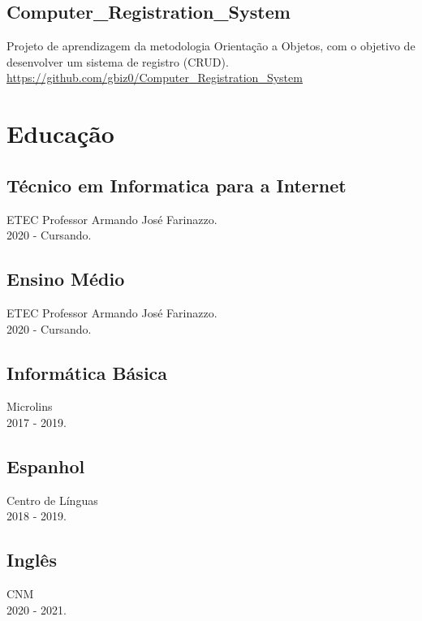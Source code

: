 \documentclass[16pt]{article}
\begin{document}
    \hfill\vline\hfill
    \begin{minipage}[t]{0.53\linewidth}
      \subsection{Computer_Registration_System}
        Projeto de aprendizagem da metodologia Orientação a Objetos, com o objetivo de desenvolver um sistema de registro (CRUD).\\

        \url{https://github.com/gbiz0/Computer_Registration_System}\\

    \end{minipage}
  \section{Educação}
    \begin{minipage}[t]{0.47\linewidth}
      \subsection{Técnico em Informatica para a Internet}
        ETEC Professor Armando José Farinazzo.\\
        2020 - Cursando.\\
      \subsection{Ensino Médio}
        ETEC Professor Armando José Farinazzo.\\
        2020 - Cursando.\\
    \end{minipage}
    \hfill\vline\hfill
    \begin{minipage}[t]{0.5\linewidth}
      \subsection{Informática Básica}
        Microlins\\
        2017 - 2019.\\
      \subsection{Espanhol}
        Centro de Línguas\\
        2018 - 2019.
      \subsection{Inglês}
        CNM\\
        2020 - 2021.
    \end{minipage}
\end{document}
